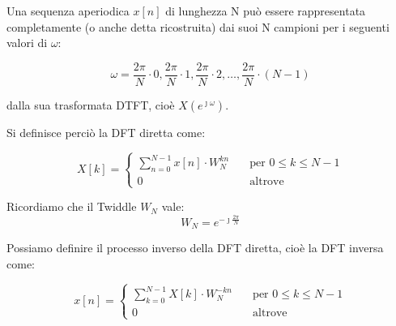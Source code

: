 Una sequenza aperiodica $x \left[ n\right]$ di lunghezza N può essere rappresentata completamente (o anche detta ricostruita) dai suoi N campioni per 
i seguenti valori di $\omega$: 

{
    \Large 
    \begin{equation}
        \omega = \dfrac{2 \pi}{N} \cdot 0, \dfrac{2 \pi}{N} \cdot 1, \dfrac{2 \pi}{N} \cdot 2, \dots, \dfrac{2 \pi}{N} \cdot \left(N -1\right) 
    \end{equation}
}

dalla sua trasformata DTFT, cioè $X \left(e^{\jmath \omega}\right)$. \newline 

Si definisce perciò la DFT diretta come: 

{
    \Large 
    \begin{equation}
        X \left[ k\right]
        = 
        \begin{cases}
            \sum_{n = 0}^{N -1}
            x \left[ n\right] \cdot W_N^{kn} \quad &\text{per } 0 \leq k \leq N -1 
            \\
            0 \quad &\text{altrove }
        \end{cases}
    \end{equation}
}

\begin{tcolorbox}
    Ricordiamo che il Twiddle $W_N$ vale: 
{
    \Large 
    \begin{equation}
        W_N = e^{- \jmath \frac{2 \pi}{N}}
    \end{equation}
}
\end{tcolorbox}

Possiamo definire il processo inverso della DFT diretta, cioè la DFT inversa come: 

{
    \Large 
    \begin{equation}
        x \left[ n\right]
        = 
        \begin{cases}
            \sum_{k = 0}^{N -1}
            X \left[ k\right] \cdot W_N^{-kn} \quad &\text{per } 0 \leq k \leq N -1 
            \\
            0 \quad &\text{altrove }
        \end{cases}
    \end{equation}
}

